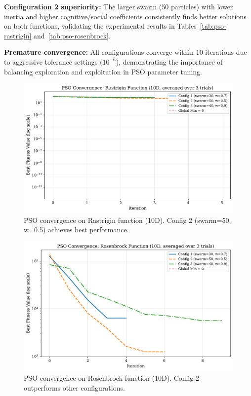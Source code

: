 \documentclass[letterpaper]{article}
\begin{document}
\textbf{Configuration 2 superiority:} The larger swarm (50 particles) with lower inertia and higher cognitive/social coefficients consistently finds better solutions on both functions, validating the experimental results in Tables~\ref{tab:pso-rastrigin} and~\ref{tab:pso-rosenbrock}.

\textbf{Premature convergence:} All configurations converge within 10 iterations due to aggressive tolerance settings ($10^{-6}$), demonstrating the importance of balancing exploration and exploitation in PSO parameter tuning.

\begin{figure}[h]
\centering
\includegraphics[width=0.9\columnwidth]{rastrigin_convergence.pdf}
\caption{PSO convergence on Rastrigin function (10D). Config 2 (swarm=50, w=0.5) achieves best performance.}
\label{fig:rastrigin-convergence}
\end{figure}

\begin{figure}[h]
\centering
\includegraphics[width=0.9\columnwidth]{rosenbrock_convergence.pdf}
\caption{PSO convergence on Rosenbrock function (10D). Config 2 outperforms other configurations.}
\label{fig:rosenbrock-convergence}
\end{figure}
\end{document}
